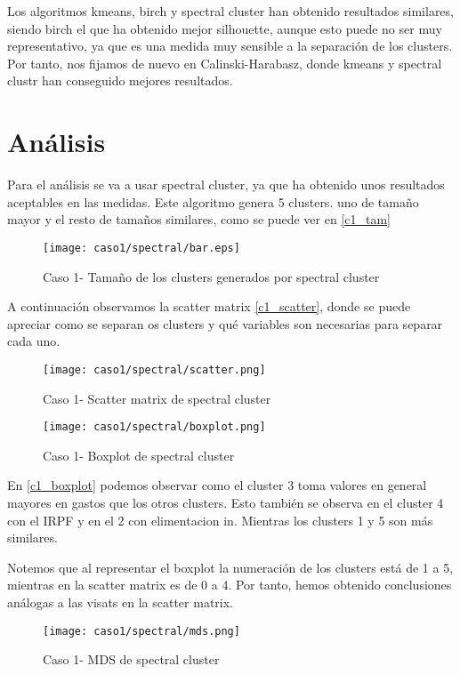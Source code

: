 Los algoritmos kmeans, birch y spectral cluster han obtenido resultados similares, siendo birch el que ha obtenido mejor silhouette, aunque esto puede no ser muy representativo, ya que es una medida muy sensible a la separación de los clusters. Por tanto, nos fijamos de nuevo en Calinski-Harabasz, donde kmeans y spectral clustr han conseguido mejores resultados.


\section{Análisis}


Para el análisis se va a usar spectral cluster, ya que ha obtenido unos resultados aceptables en las medidas. Este algoritmo genera 5 clusters. uno de tamaño mayor y el resto de tamaños similares, como se puede ver en \eqref{c1_tam}

\begin{figure}[H]
\caption{Caso 1- Tamaño de los clusters generados por spectral cluster}
\label{c1_tam}
\texttt{[image: caso1/spectral/bar.eps]}
\end{figure}

A continuación observamos la scatter matrix \eqref{c1_scatter}, donde se puede apreciar como se separan os clusters y qué variables son necesarias para separar cada uno.

\begin{figure}[H]
\caption{Caso 1- Scatter matrix de spectral cluster}
\label{c1_scatter}
\texttt{[image: caso1/spectral/scatter.png]}
\end{figure}


\begin{figure}[H]
\caption{Caso 1- Boxplot de spectral cluster}
\label{c1_boxplot}
\texttt{[image: caso1/spectral/boxplot.png]}
\end{figure}

En \eqref{c1_boxplot} podemos observar como el cluster 3 toma valores en general mayores en gastos que los otros clusters. Esto también se observa en el cluster 4 con el IRPF y en el 2 con elimentacion in. Mientras los clusters 1 y 5 son más similares.

Notemos que al representar el boxplot la numeración de los clusters está de 1 a 5, mientras en la scatter matrix es de 0 a 4. Por tanto, hemos obtenido conclusiones análogas a las visats en la scatter matrix.

\begin{figure}[H]
\caption{Caso 1- MDS de spectral cluster}
\label{c1_mds}
\texttt{[image: caso1/spectral/mds.png]}
\end{figure}

